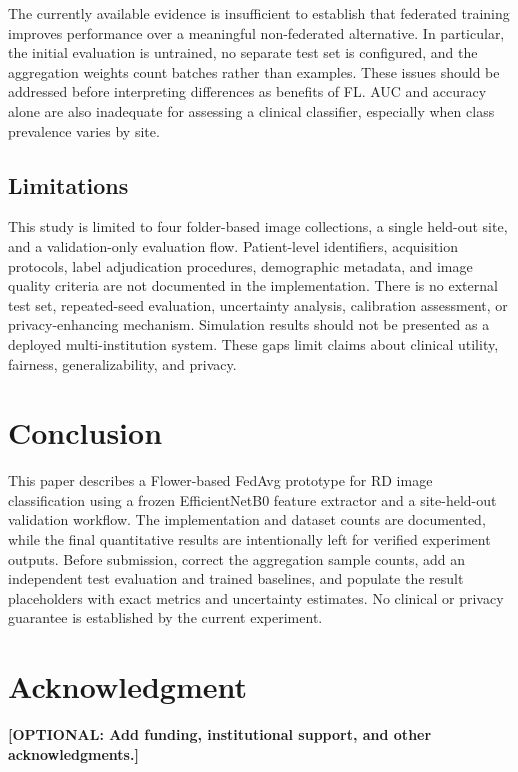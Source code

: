 \documentclass[conference]{IEEEtran}
\begin{document}
The currently available evidence is insufficient to establish that federated training improves performance over a meaningful non-federated alternative. In particular, the initial evaluation is untrained, no separate test set is configured, and the aggregation weights count batches rather than examples. These issues should be addressed before interpreting differences as benefits of FL. AUC and accuracy alone are also inadequate for assessing a clinical classifier, especially when class prevalence varies by site.

\subsection{Limitations}
This study is limited to four folder-based image collections, a single held-out site, and a validation-only evaluation flow. Patient-level identifiers, acquisition protocols, label adjudication procedures, demographic metadata, and image quality criteria are not documented in the implementation. There is no external test set, repeated-seed evaluation, uncertainty analysis, calibration assessment, or privacy-enhancing mechanism. Simulation results should not be presented as a deployed multi-institution system. These gaps limit claims about clinical utility, fairness, generalizability, and privacy.

\section{Conclusion}
This paper describes a Flower-based FedAvg prototype for RD image classification using a frozen EfficientNetB0 feature extractor and a site-held-out validation workflow. The implementation and dataset counts are documented, while the final quantitative results are intentionally left for verified experiment outputs. Before submission, correct the aggregation sample counts, add an independent test evaluation and trained baselines, and populate the result placeholders with exact metrics and uncertainty estimates. No clinical or privacy guarantee is established by the current experiment.

\section*{Acknowledgment}
\textbf{[OPTIONAL: Add funding, institutional support, and other acknowledgments.]}
\end{document}
